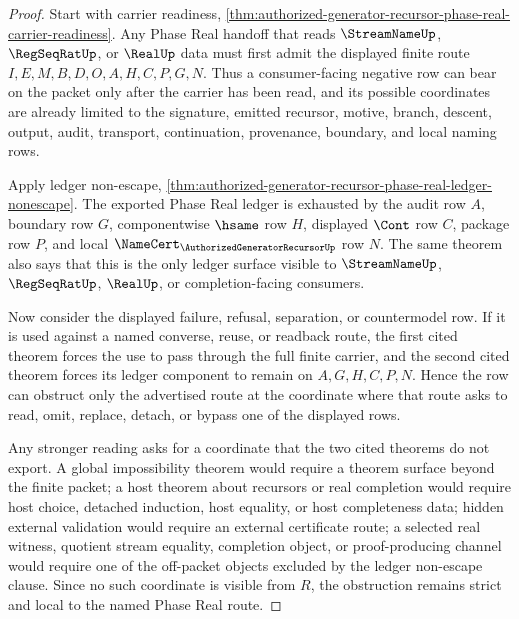 \begin{proof}
Start with carrier readiness, \autoref{thm:authorized-generator-recursor-phase-real-carrier-readiness}. Any Phase Real handoff that reads $\StreamNameUp$, $\RegSeqRatUp$, or $\RealUp$ data must first admit the displayed finite route $I,E,M,B,D,O,A,H,C,P,G,N$. Thus a consumer-facing negative row can bear on the packet only after the carrier has been read, and its possible coordinates are already limited to the signature, emitted recursor, motive, branch, descent, output, audit, transport, continuation, provenance, boundary, and local naming rows.

Apply ledger non-escape, \autoref{thm:authorized-generator-recursor-phase-real-ledger-nonescape}. The exported Phase Real ledger is exhausted by the audit row $A$, boundary row $G$, componentwise $\hsame$ row $H$, displayed $\Cont$ row $C$, package row $P$, and local $\NameCert_{\AuthorizedGeneratorRecursorUp}$ row $N$. The same theorem also says that this is the only ledger surface visible to $\StreamNameUp$, $\RegSeqRatUp$, $\RealUp$, or completion-facing consumers.

Now consider the displayed failure, refusal, separation, or countermodel row. If it is used against a named converse, reuse, or readback route, the first cited theorem forces the use to pass through the full finite carrier, and the second cited theorem forces its ledger component to remain on $A,G,H,C,P,N$. Hence the row can obstruct only the advertised route at the coordinate where that route asks to read, omit, replace, detach, or bypass one of the displayed rows.

Any stronger reading asks for a coordinate that the two cited theorems do not export. A global impossibility theorem would require a theorem surface beyond the finite packet; a host theorem about recursors or real completion would require host choice, detached induction, host equality, or host completeness data; hidden external validation would require an external certificate route; a selected real witness, quotient stream equality, completion object, or proof-producing channel would require one of the off-packet objects excluded by the ledger non-escape clause. Since no such coordinate is visible from $R$, the obstruction remains strict and local to the named Phase Real route.
\end{proof}
